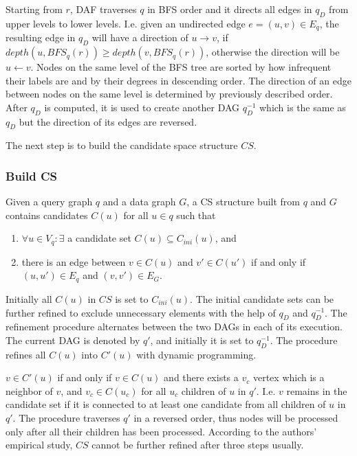 Starting from $r$, DAF traverses $q$ in BFS order and it directs all edges in $q_D$ from upper levels to
lower levels. I.e. given an undirected edge $e = (u, v) \in E_q$, the resulting edge in $q_D$ will have
a direction of $u \rightarrow v$, if $depth(u, BFS_q(r)) \geq depth(v, BFS_q(r))$, otherwise the direction
will be $u \leftarrow v$. Nodes on the same level of the BFS tree are sorted by how infrequent their labels
are and by their degrees in descending order. The direction of an edge between nodes on the same level is 
determined by previously described order. After $q_D$ is computed, it is used to create another DAG $q^{-1}_D$
which is the same as $q_D$ but the direction of its edges are reversed.

The next step is to build the candidate space structure $CS$.

\subsubsection{Build CS}

Given a query graph $q$ and a data graph $G$, a CS structure built from $q$ and $G$ contains candidates $C(u)$
for all $u \in q$ such that

\begin{enumerate}
    \item $\forall u \in V_q : \exists$ a candidate set $C(u) \subseteq C_{ini}(u)$, and
    \item there is an edge between $v \in C(u)$ and $v' \in C(u')$ if and only if $(u, u') \in E_q$ and $(v, v') \in E_G$.
\end{enumerate}

Initially all $C(u)$ in $CS$ is set to $C_{ini}(u)$. The initial candidate sets can be further refined
to exclude unnecessary elements with the help of $q_D$ and $q^{-1}_D$. The refinement procedure alternates
between the two DAGs in each of its execution. The current DAG is denoted by $q'$, and initially it is set
to $q^{-1}_D$. The procedure refines all $C(u)$ into $C'(u)$ with dynamic programming.

$v \in C'(u)$ if and only if $v \in C(u)$ and there exists a $v_c$ vertex which is a neighbor of $v$, and
$v_c \in C(u_c)$ for all $u_c$ children of $u$ in $q'$. I.e. $v$ remains in the candidate set if it is
connected to at least one candidate from all children of $u$ in $q'$. The procedure traverses $q'$ in a
reversed order, thus nodes will be processed only after all their children has been processed. According to
the authors' empirical study, $CS$ cannot be further refined after three steps usually.

